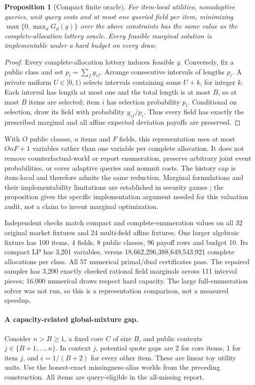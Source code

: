 \documentclass[11pt]{article}
\newtheorem{proposition}{Proposition}
\begin{document}
\begin{proposition}[Compact finite oracle]
For item-local utilities, nonadaptive queries, unit query costs and at most one
queried field per item, minimizing $\max\{0,\max_d G_d(y)\}$ over the above
constraints has the same value as the complete-allocation lottery oracle.
Every feasible marginal solution is implementable under a hard budget on every draw.
\end{proposition}
\begin{proof}
Every complete-allocation lottery induces feasible $y$. Conversely, fix a
public class and set $p_i=\sum_f y_{if}$. Arrange consecutive intervals of lengths
$p_i$. A private uniform $U\in[0,1)$ selects intervals containing some $U+k$,
for integer $k$. Each interval has length at most one and the total length is
at most $B$, so at most $B$ items are selected; item $i$ has selection probability
$p_i$. Conditional on selection, draw its field with probability $y_{if}/p_i$.
Thus every field has exactly the prescribed marginal and all affine expected
deviation payoffs are preserved.\end{proof}

With $O$ public classes, $n$ items and $F$ fields, this representation uses at
most $OnF+1$ variables rather than one variable per complete allocation. It does
not remove counterfactual-world or report enumeration, preserve arbitrary joint
event probabilities, or cover adaptive queries and nonunit costs. The history
cap is item-local and therefore admits the same reduction. Marginal formulations
and their implementability limitations are established in security games
\cite{marginals}; the proposition gives the specific implementation argument
needed for this valuation audit, not a claim to invent marginal optimization.

Independent checks match compact and complete-enumeration values on all 32 original
market fixtures and 24 multi-field affine fixtures. One larger algebraic fixture
has 100 items, 4 fields, 8 public classes, 96 payoff rows and budget 10. Its compact
LP has 3,201 variables, versus 18,662,296,388,649,543,921 complete allocations
per class. All 57 numerical primal/dual certificates pass. The repaired sampler
has 3,200 exactly checked rational field marginals across 111 interval pieces;
16,000 numerical draws respect hard capacity. The large full-enumeration solver
was not run, so this is a representation comparison, not a measured speedup.

\paragraph{A capacity-related global-mixture gap.}
Consider $n>B\ge1$, a fixed core $C$ of size $B$, and public contexts
$j\in\{B+1,\ldots,n\}$. In context $j$, potential quote gaps are 2 for core
items, 1 for item $j$, and $\epsilon=1/(B+2)$ for every other item. These are
linear toy utility units. Use the honest-exact missingness-alias worlds from
the preceding construction. All items are query-eligible in the all-missing report.
\end{document}
